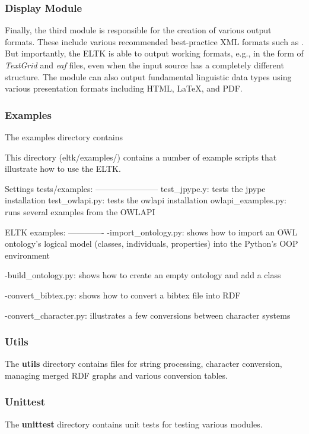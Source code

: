 \documentclass[]{article}
\begin{document}
\subsubsection{Display Module}

Finally, the third module is responsible for the creation of various output formats. These include various recommended best-practice XML formats such as \cite{BowHughesBird2003}. But importantly, the ELTK is able to output working formats, e.g., in the form of \textit{TextGrid} and \textit{eaf} files, even when the input source has a completely different structure. The module can also output fundamental linguistic data types using various presentation formats including HTML, \LaTeX, and PDF.

\subsubsection{Examples}

The examples directory contains

This directory (eltk/examples/) contains a number of example scripts that illustrate how to use the ELTK.

Settings tests/examples:
-----------------------
test\_jpype.y: tests the jpype installation
test\_owlapi.py: tests the owlapi installation
owlapi\_examples.py: runs several examples from the OWLAPI


ELTK examples:
-------------
-import\_ontology.py: shows how to import an OWL ontology's logical model (classes, individuals, properties) into the Python's OOP environment

-build\_ontology.py: shows how to create an empty ontology and add a class 

-convert\_bibtex.py: shows how to convert a bibtex file into RDF

-convert\_character.py: illustrates a few conversions between character systems


\subsubsection{Utils}
The \textbf{utils} directory contains files for string processing, character conversion, managing merged RDF graphs and various conversion tables.

\subsubsection{Unittest}
The \textbf{unittest} directory contains unit tests for testing various modules.
\end{document}

